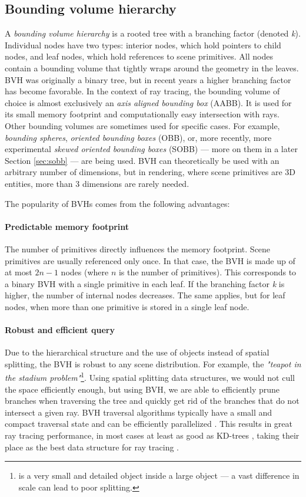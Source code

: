 \subsection{Bounding volume hierarchy}
A \textit{bounding volume hierarchy} is a rooted tree with a branching factor (denoted \textit{k}). Individual nodes have two types: interior nodes, which hold pointers to child nodes, and leaf nodes, which hold references to scene primitives. All nodes contain a bounding volume that tightly wraps around the geometry in the leaves. BVH was originally a binary tree, but in recent years a higher branching factor has become favorable. In the context of ray tracing, the bounding volume of choice is almost exclusively an \textit{axis aligned bounding box} (AABB). It is used for its small memory footprint and computationally easy intersection with rays. Other bounding volumes are sometimes used for specific cases. For example, \textit{bounding spheres}, \textit{oriented bounding boxes} (OBB), or, more recently, more experimental \textit{skewed oriented bounding boxes} (SOBB) — more on them in a later Section \ref{sec:sobb} — are being used. BVH can theoretically be used with an arbitrary number of dimensions, but in rendering, where scene primitives are 3D entities, more than 3 dimensions are rarely needed.

The popularity of BVHs comes from the following advantages:

\paragraph{Predictable memory footprint} The number of primitives directly influences the memory footprint. Scene primitives are usually referenced only once. In that case, the BVH is made up of at most $2n-1$ nodes (where $n$ is the number of primitives). This corresponds to a binary BVH with a single primitive in each leaf. If the branching factor \textit{k} is higher, the number of internal nodes decreases. The same applies, but for leaf nodes, when more than one primitive is stored in a single leaf node. \cite{Meister2021}

\paragraph{Robust and efficient query} Due to the hierarchical structure and the use of objects instead of spatial splitting, the BVH is robust to any scene distribution. For example, the \textit{"teapot in the stadium problem"}\footnote{ is a very small and detailed object inside a large object — a vast difference in scale can lead to poor splitting.}. Using spatial splitting data structures, we would not cull the space efficiently enough, but using BVH, we are able to efficiently prune branches when traversing the tree and quickly get rid of the branches that do not intersect a given ray. BVH traversal algorithms typically have a small and compact traversal state and can be efficiently parallelized \cite{Meister2021}. This results in great ray tracing performance, in most cases at least as good as KD-trees \cite{VHB16}, taking their place as the best data structure for ray tracing \cite{Hav00}.

